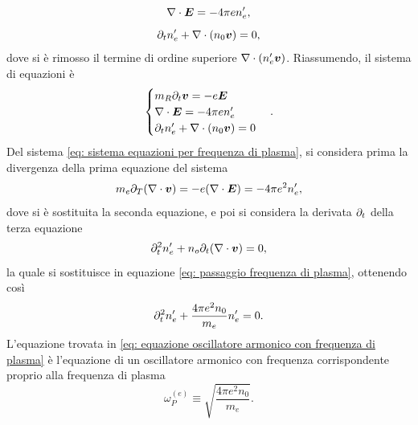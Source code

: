 \begin{equation}
    \nabla \cdot \bm{E} = -4\pi en_e',
\end{equation}
\begin{equation}
    \partial_tn_e' + \nabla \cdot (n_0\bm{v}) = 0,
\end{equation}
dove si è rimosso il termine di ordine superiore $\nabla \cdot (n_e'\bm{v})$. Riassumendo, il sistema di equazioni è
\begin{equation}
\label{eq: sistema equazioni per frequenza di plasma}
    \begin{cases}
        m_R\partial_t\bm{v} = -e\bm{E} \\
        \nabla \cdot \bm{E} = -4\pi en_e' \\
        \partial_tn_e' + \nabla \cdot (n_0\bm{v}) = 0
    \end{cases}.
\end{equation}
Del sistema \eqref{eq: sistema equazioni per frequenza di plasma}, si considera prima la divergenza della prima equazione del sistema
\begin{equation}
\label{eq: passaggio frequenza di plasma}
    m_e \partial_T(\nabla \cdot \bm{v}) = -e(\nabla \cdot \bm{E}) = -4\pi e^2n_e',
\end{equation}
dove si è sostituita la seconda equazione, e poi si considera la derivata $\partial_t$ della terza equazione
\begin{equation}
    \partial_t^2n_e' + n_o\partial_t(\nabla \cdot \bm{v}) = 0,
\end{equation}
la quale si sostituisce in equazione \eqref{eq: passaggio frequenza di plasma}, ottenendo così
\begin{equation}
\label{eq: equazione oscillatore armonico con frequenza di plasma}
    \partial_t^2n_e' + \frac{4\pi e^2n_0}{m_e}n_e' = 0.
\end{equation}
L'equazione trovata in \eqref{eq: equazione oscillatore armonico con frequenza di plasma} è l'equazione di un oscillatore armonico con frequenza corrispondente proprio alla frequenza di plasma
\begin{equation}
    \omega_P^{(e)} \equiv \sqrt{\frac{4\pi e^2n_0}{m_e}}.
\end{equation}

